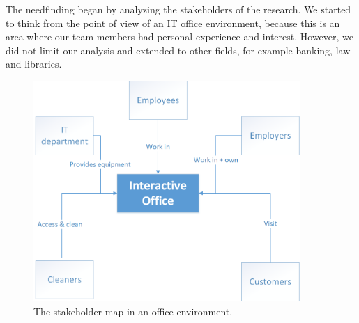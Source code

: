
The needfinding began by analyzing the stakeholders of the research. We started to think from the point of view of an IT office environment, because this is an area where our team members had personal experience and interest. However, we did not limit our analysis and extended to other fields, for example banking, law and libraries. 

	\begin{figure}[h] 
		\begin{center}
			\includegraphics[width=0.9\textwidth]{images/stakeholdermap.png}
			\caption{The stakeholder map in an office environment.}
			\label{stakeholder_map}
		\end{center}
	\end{figure}

